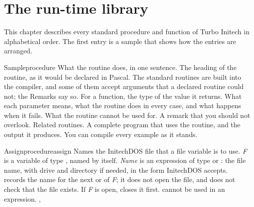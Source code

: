 \LibraryHeads
\LetterTabs
\chapter{The run-time library}

This chapter describes every standard procedure and function of Turbo
Initech in alphabetical order.  The first entry is a sample that shows how
the entries are arranged.

\begin{LibEntry}{Sample}{procedure}{}
\LFunction What the routine does, in one sentence.
\LDeclaration The heading of the routine, as it would be declared in
Pascal.  The standard routines are built into the compiler, and some of
them accept arguments that a declared routine could not; the Remarks say
so.
\LResultType For a function, the type of the value it returns.
\LRemarks What each parameter means, what the routine does in every case,
and what happens when it fails.
\LRestrictions What the routine cannot be used for.
\LArrow A remark that you should not overlook.
\LSeeAlso Related routines.
\LExample A complete program that uses the routine, and the output it
produces.  You can compile every example as it stands.
\end{LibEntry}

\begin{LibEntry}{Assign}{procedure}{assign}
\LFunction Names the InitechDOS file that a file variable is to use.
\LDeclaration {}
\LRemarks \textit{F} is a variable of type , named by itself.
\textit{Name} is an expression of type  or : the file
name, with drive and directory if needed, in the form InitechDOS accepts.
 records the name for the next  or
 of \textit{F}; it does not open the file, and does not
check that the file exists.  If \textit{F} is open, 
closes it first.
\LRestrictions {} cannot be used in an expression.
\LSeeAlso {}, 
\LExample
{}
\end{LibEntry}

